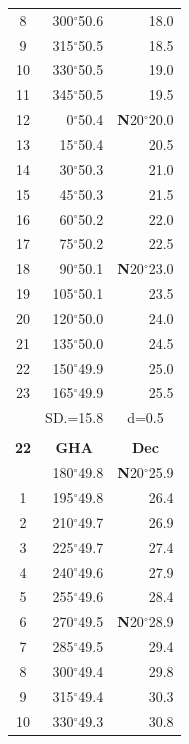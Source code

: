 \documentclass[10pt, a4paper]{report}
\begin{document}
\begin{scriptsize}
\begin{tabular*}{0.2\textwidth}[t]{@{\extracolsep{\fill}}|c|rr|}
8 & 300$^\circ$50.6 & 18.0\\
9 & 315$^\circ$50.5 & \raisebox{0.24ex}{\boldmath$\cdot$~\boldmath$\cdot$~~}18.5\\
10 & 330$^\circ$50.5 & 19.0\\
11 & 345$^\circ$50.5 & 19.5\\[2Pt]
12 & 0$^\circ$50.4 & \textbf{N}20$^\circ$20.0\\
13 & 15$^\circ$50.4 & 20.5\\
14 & 30$^\circ$50.3 & 21.0\\
15 & 45$^\circ$50.3 & \raisebox{0.24ex}{\boldmath$\cdot$~\boldmath$\cdot$~~}21.5\\
16 & 60$^\circ$50.2 & 22.0\\
17 & 75$^\circ$50.2 & 22.5\\[2Pt]
18 & 90$^\circ$50.1 & \textbf{N}20$^\circ$23.0\\
19 & 105$^\circ$50.1 & 23.5\\
20 & 120$^\circ$50.0 & 24.0\\
21 & 135$^\circ$50.0 & \raisebox{0.24ex}{\boldmath$\cdot$~\boldmath$\cdot$~~}24.5\\
22 & 150$^\circ$49.9 & 25.0\\
23 & 165$^\circ$49.9 & 25.5\\
\hline
\rule{0pt}{2.4ex} & \multicolumn{1}{c}{SD.=15.8} & \multicolumn{1}{c|}{d=0.5}\\
\hline
\multicolumn{1}{c}{}\\[-0.5ex]\hline
\multicolumn{1}{|c|}{\rule{0pt}{2.6ex}\textbf{22}} & \multicolumn{1}{c}{\textbf{GHA}} & \multicolumn{1}{c|}{\textbf{Dec}}\\
\hline\rule{0pt}{2.6ex}\noindent
0 & 180$^\circ$49.8 & \textbf{N}20$^\circ$25.9\\
1 & 195$^\circ$49.8 & 26.4\\
2 & 210$^\circ$49.7 & 26.9\\
3 & 225$^\circ$49.7 & \raisebox{0.24ex}{\boldmath$\cdot$~\boldmath$\cdot$~~}27.4\\
4 & 240$^\circ$49.6 & 27.9\\
5 & 255$^\circ$49.6 & 28.4\\[2Pt]
6 & 270$^\circ$49.5 & \textbf{N}20$^\circ$28.9\\
7 & 285$^\circ$49.5 & 29.4\\
8 & 300$^\circ$49.4 & 29.8\\
9 & 315$^\circ$49.4 & \raisebox{0.24ex}{\boldmath$\cdot$~\boldmath$\cdot$~~}30.3\\
10 & 330$^\circ$49.3 & 30.8\\

\end{tabular*}
\end{scriptsize}
\end{document}
